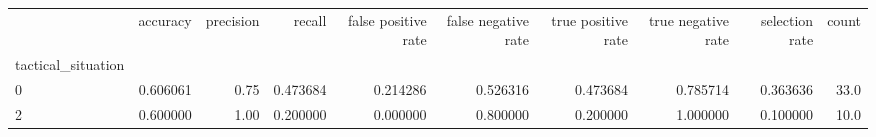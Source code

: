 \begin{tabular}{lrrrrrrrrr}
\toprule
{} &  accuracy &  precision &    recall &  false positive rate &  false negative rate &  true positive rate &  true negative rate &  selection rate &  count \\
tactical\_situation &           &            &           &                      &                      &                     &                     &                 &        \\
\midrule
0                  &  0.606061 &       0.75 &  0.473684 &             0.214286 &             0.526316 &            0.473684 &            0.785714 &        0.363636 &   33.0 \\
2                  &  0.600000 &       1.00 &  0.200000 &             0.000000 &             0.800000 &            0.200000 &            1.000000 &        0.100000 &   10.0 \\
\bottomrule
\end{tabular}

